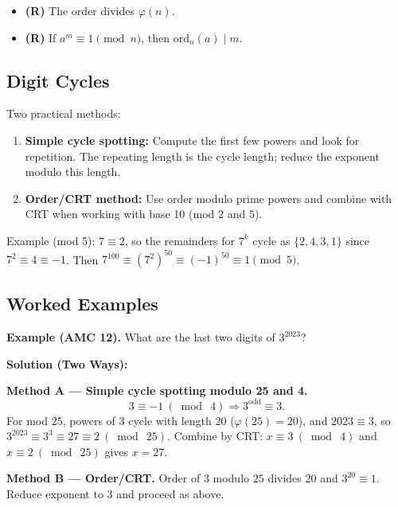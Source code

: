 \documentclass[12pt]{extarticle}
\begin{document}
\begin{itemize}
\item \textbf{(R)} The order divides $\varphi(n)$.
\item \textbf{(R)} If $a^m\equiv1\pmod n$, then $\text{ord}_n(a)\mid m$.
\end{itemize}

\subsection*{Digit Cycles}
Two practical methods:
\begin{enumerate}
\item \textbf{Simple cycle spotting:} Compute the first few powers and look for repetition. The repeating length is the cycle length; reduce the exponent modulo this length.
\item \textbf{Order/CRT method:} Use order modulo prime powers and combine with CRT when working with base 10 (mod $2$ and $5$).
\end{enumerate}

\begin{remarkbox}
Example (mod 5): $7\equiv 2$, so the remainders for $7^k$ cycle as $\{2,4,3,1\}$ since $7^2\equiv 4\equiv -1$. Then $7^{100}\equiv (7^2)^{50}\equiv (-1)^{50}\equiv 1\pmod5$.
\end{remarkbox}

\subsection*{Worked Examples}

\begin{examplebox}
	\textbf{Example (AMC 12).} What are the last two digits of $3^{2023}$?
\end{examplebox}

	\textbf{Solution (Two Ways):}

	\textbf{Method A — Simple cycle spotting modulo 25 and 4.}
\[3\equiv -1\ (\bmod\ 4) \Rightarrow 3^{\text{odd}}\equiv 3.\]
For mod $25$, powers of $3$ cycle with length $20$ ($\varphi(25)=20$), and $2023\equiv 3$, so $3^{2023}\equiv 3^3\equiv 27\equiv 2\ (\bmod\ 25)$. Combine by CRT: $x\equiv 3\ (\bmod\ 4)$ and $x\equiv 2\ (\bmod\ 25)$ gives $x=27$.

	\textbf{Method B — Order/CRT.}
Order of $3$ modulo $25$ divides $20$ and $3^{20}\equiv1$. Reduce exponent to $3$ and proceed as above.

\end{document}
